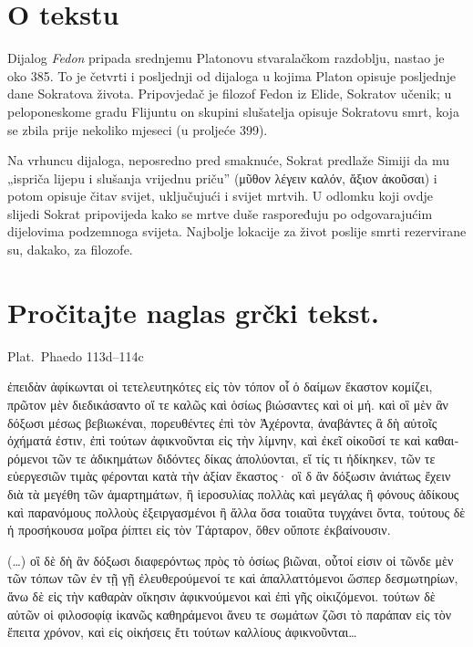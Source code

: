 


\section*{O tekstu}

Dijalog \textit{Fedon} pripada srednjemu Platonovu stvaralačkom razdoblju, nastao je oko 385. To je četvrti i posljednji od dijaloga u kojima Platon opisuje posljednje dane Sokratova života. Pripovjedač je filozof Fedon iz Elide, Sokratov učenik; u peloponeskome gradu Flijuntu on skupini slušatelja opisuje Sokratovu smrt, koja se zbila prije nekoliko mjeseci (u proljeće 399).

Na vrhuncu dijaloga, neposredno pred smaknuće, Sokrat predlaže Simiji da mu „ispriča lijepu i slušanja vrijednu priču'' \textgreek[variant=ancient]{(μῦθον λέγειν καλόν, ἄξιον ἀκοῦσαι)} i potom opisuje čitav svijet, uključujući i svijet mrtvih. U odlomku koji ovdje slijedi Sokrat pripovijeda kako se mrtve duše raspoređuju po odgovarajućim dijelovima podzemnoga svijeta. Najbolje lokacije za život poslije smrti rezervirane su, dakako, za filozofe.



\section*{Pročitajte naglas grčki tekst.}

Plat.\ Phaedo 113d–114c


\medskip


{\large

\begin{greek}

\noindent ἐπειδὰν ἀφίκωνται οἱ τετελευτηκότες εἰς τὸν τόπον οἷ ὁ δαίμων ἕκαστον κομίζει, πρῶτον μὲν διεδικάσαντο οἵ τε καλῶς καὶ ὁσίως βιώσαντες καὶ οἱ μή. καὶ οἳ μὲν ἂν δόξωσι μέσως βεβιωκέναι, πορευθέντες ἐπὶ τὸν Ἀχέροντα, ἀναβάντες ἃ δὴ αὐτοῖς ὀχήματά ἐστιν, ἐπὶ τούτων ἀφικνοῦνται εἰς τὴν λίμνην, καὶ ἐκεῖ οἰκοῦσί τε καὶ καθαιρόμενοι τῶν τε ἀδικημάτων διδόντες δίκας ἀπολύονται, εἴ τίς τι ἠδίκηκεν, τῶν τε εὐεργεσιῶν τιμὰς φέρονται κατὰ τὴν ἀξίαν ἕκαστος· οἳ δ ἂν δόξωσιν ἀνιάτως ἔχειν διὰ τὰ μεγέθη τῶν ἁμαρτημάτων, ἢ ἱεροσυλίας πολλὰς καὶ μεγάλας ἢ φόνους ἀδίκους καὶ παρανόμους πολλοὺς ἐξειργασμένοι ἢ ἄλλα ὅσα τοιαῦτα τυγχάνει ὄντα, τούτους δὲ ἡ προσήκουσα μοῖρα ῥίπτει εἰς τὸν Τάρταρον, ὅθεν οὔποτε ἐκβαίνουσιν.

\noindent (\dots) οἳ δὲ δὴ ἂν δόξωσι διαφερόντως πρὸς τὸ ὁσίως βιῶναι, οὗτοί εἰσιν οἱ τῶνδε μὲν τῶν τόπων τῶν ἐν τῇ γῇ ἐλευθερούμενοί τε καὶ ἀπαλλαττόμενοι ὥσπερ δεσμωτηρίων, ἄνω δὲ εἰς τὴν καθαρὰν οἴκησιν ἀφικνούμενοι καὶ ἐπὶ γῆς οἰκιζόμενοι. τούτων δὲ αὐτῶν οἱ φιλοσοφίᾳ ἱκανῶς καθηράμενοι ἄνευ τε σωμάτων ζῶσι τὸ παράπαν εἰς τὸν ἔπειτα χρόνον, καὶ εἰς οἰκήσεις ἔτι τούτων καλλίους ἀφικνοῦνται\dots

\end{greek}

}


